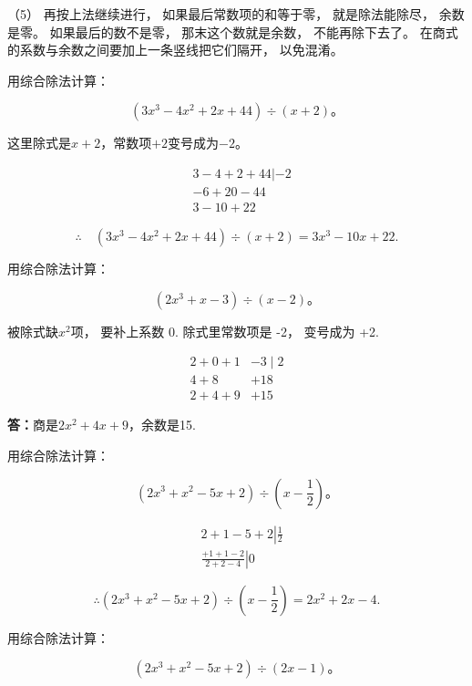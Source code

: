 （5） 再按上法继续进行， 如果最后常数项的和等于零， 就是除法能除尽，
余数是零。 如果最后的数不是零， 那末这个数就是余数， 不能再除下去了。
在商式的系数与余数之间要加上一条竖线把它们隔开， 以免混淆。

 用综合除法计算：

\[
(3 x ^{3} - 4 x ^{2} + 2 x + 44) \div (x + 2)\text{。}
\]

 这里除式是\(x + 2\)，常数项\(+2\)变号成为\(-2\)。


\[
\begin{array}{rl} & 3 - 4 + 2 + 44 \left| - 2 \right. \\ & - 6 + 20 - 44 \\ \hline {} & 3 - 10 + 22 \end{array}
\]

\[
\therefore \quad (3 x ^{3} - 4 x ^{2} + 2 x + 44) \div (x + 2) = 3 x ^{3} - 10 x + 22.
\]

 用综合除法计算：

\[
(2 x ^{3} + x - 3) \div (x - 2)\text{。}
\]

 被除式缺\(x^{2}\)项， 要补上系数 0. 除式里常数项是
-2， 变号成为 +2.


\[
\begin{array}{rl} 2 + 0 + 1 & - 3 \mid 2 \\ 4 + 8 & + 18 \\ \hline 2 + 4 + 9 & + 15 \end{array}
\]

\textbf{答：}商是\(2x^{2} + 4x + 9\)，余数是15.

 用综合除法计算：

\[
(2 x ^{3} + x ^{2} - 5 x + 2) \div \left(x - \frac{1}{2}\right)\text{。}
\]


\[
\begin{array}{rl} & 2 + 1 - 5 + 2 \left| \frac{1}{2} \right. \\ & \left. \frac{+ 1 + 1 - 2}{2 + 2 - 4} \right| 0 \end{array}
\]

\[
\therefore (2 x ^{3} + x ^{2} - 5 x + 2) \div \left(x - \frac{1}{2}\right) = 2 x ^{2} + 2 x - 4.
\]

 用综合除法计算：

\[
(2 x ^{3} + x ^{2} - 5 x + 2) \div (2 x - 1)\text{。}
\]

